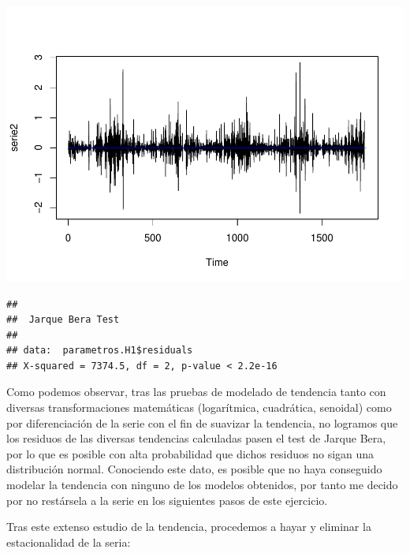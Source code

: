 \documentclass[]{article}
\newenvironment{Shaded}{\begin{snugshade}}{\end{snugshade}}
\newcommand{\KeywordTok}[1]{\textcolor[rgb]{0.13,0.29,0.53}{\textbf{#1}}}
\newcommand{\DecValTok}[1]{\textcolor[rgb]{0.00,0.00,0.81}{#1}}
\newcommand{\StringTok}[1]{\textcolor[rgb]{0.31,0.60,0.02}{#1}}
\newcommand{\CommentTok}[1]{\textcolor[rgb]{0.56,0.35,0.01}{\textit{#1}}}
\newcommand{\OperatorTok}[1]{\textcolor[rgb]{0.81,0.36,0.00}{\textbf{#1}}}
\newcommand{\NormalTok}[1]{#1}
\begin{document}
\includegraphics{exercise2_files/figure-latex/unnamed-chunk-20-1.pdf}

\begin{Shaded}
\end{Shaded}

\begin{verbatim}
## 
##  Jarque Bera Test
## 
## data:  parametros.H1$residuals
## X-squared = 7374.5, df = 2, p-value < 2.2e-16
\end{verbatim}

Como podemos observar, tras las pruebas de modelado de tendencia tanto
con diversas transformaciones matemáticas (logarítmica, cuadrática,
senoidal) como por diferenciación de la serie con el fin de suavizar la
tendencia, no logramos que los residuos de las diversas tendencias
calculadas pasen el test de Jarque Bera, por lo que es posible con alta
probabilidad que dichos residuos no sigan una distribución normal.
Conociendo este dato, es posible que no haya conseguido modelar la
tendencia con ninguno de los modelos obtenidos, por tanto me decido por
no restársela a la serie en los siguientes pasos de este ejercicio.

Tras este extenso estudio de la tendencia, procedemos a hayar y eliminar
la estacionalidad de la seria:

\begin{Shaded}
\end{Shaded}
\end{document}
